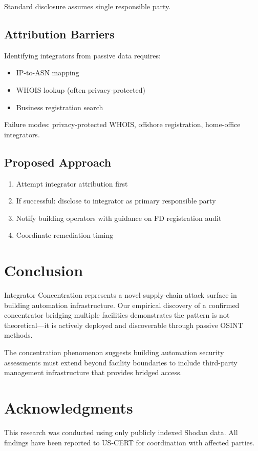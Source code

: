 \documentclass[11pt,a4paper]{article}
\begin{document}
Standard disclosure assumes single responsible party.

\subsection{Attribution Barriers}

Identifying integrators from passive data requires:
\begin{itemize}
  \item IP-to-ASN mapping
  \item WHOIS lookup (often privacy-protected)
  \item Business registration search
\end{itemize}

Failure modes: privacy-protected WHOIS, offshore registration, 
home-office integrators.

\subsection{Proposed Approach}

\begin{enumerate}
  \item Attempt integrator attribution first
  \item If successful: disclose to integrator as primary responsible party
  \item Notify building operators with guidance on FD registration audit
  \item Coordinate remediation timing
\end{enumerate}

\section{Conclusion}

Integrator Concentration represents a novel supply-chain attack surface 
in building automation infrastructure. Our empirical discovery of a 
confirmed concentrator bridging multiple facilities demonstrates the 
pattern is not theoretical---it is actively deployed and discoverable 
through passive OSINT methods.

The concentration phenomenon suggests building automation security 
assessments must extend beyond facility boundaries to include third-party 
management infrastructure that provides bridged access.

\section*{Acknowledgments}

This research was conducted using only publicly indexed Shodan data.
All findings have been reported to US-CERT for coordination with 
affected parties.
\end{document}

